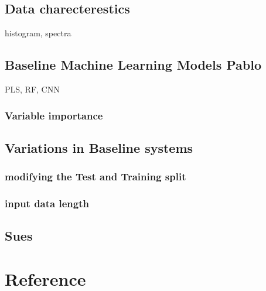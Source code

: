 \documentclass[12pt,a4paper]{report}
\begin{document}
\section{Data charecterestics}
histogram, spectra
\section{Baseline Machine Learning Models Pablo}
PLS, RF, CNN

\subsection{Variable importance}

\section{ Variations in Baseline systems}
\subsection{ modifying the Test and Training split}
\subsection{ input data length}

\section{Sues}

\chapter{Reference}
\end{document}
